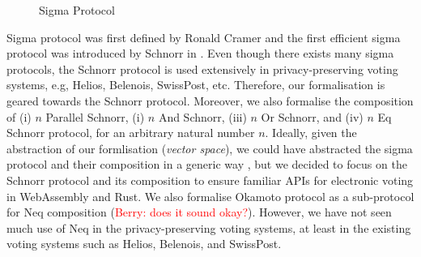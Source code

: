 \documentclass[conference,compsoc]{IEEEtran}
\begin{document}
\begin{figure}[ht]
  \centering
{}
\caption{Sigma Protocol}
\label{fig:sig_picture}
\end{figure}







Sigma protocol was first defined by Ronald Cramer \cite{cramer1996modular} 
and the first efficient sigma protocol was introduced by Schnorr in \cite{schnorr1991efficient}. 
Even though there exists many sigma protocols, the Schnorr protocol is used extensively in privacy-preserving voting systems, e.g, Helios, Belenois, SwissPost, etc. Therefore, 
our formalisation is geared towards the Schnorr protocol. 
Moreover, we also formalise the composition of (i) $n$ Parallel Schnorr, 
(i) $n$ And Schnorr, (iii) $n$ Or Schnorr, and (iv) $n$ Eq Schnorr protocol, for an arbitrary natural number $n$. 
Ideally, given the abstraction of our formlisation (\textit{vector space}), we could have 
abstracted the sigma protocol and their composition in a generic way \cite{10.1007/978-3-642-02384-2_17},
but we decided to focus on the Schnorr protocol and its composition to ensure familiar APIs 
for electronic voting in WebAssembly and Rust. We also formalise Okamoto protocol as a sub-protocol 
for Neq composition (\textcolor{red}{Berry: does it sound okay?}). However, we have not seen 
much use of Neq in the privacy-preserving voting systems, at least in the existing voting systems 
such as Helios, Belenois, and SwissPost.  
\end{document}

